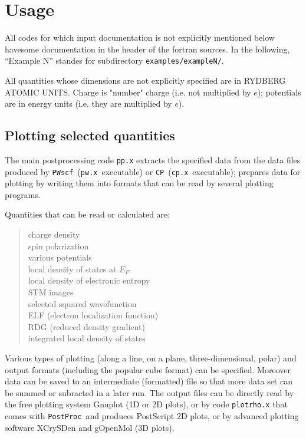 \documentclass[12pt,a4paper]{article}
\def\pwx{\texttt{pw.x}}
\def\cpx{\texttt{cp.x}}
\def\PWscf{\texttt{PWscf}}
\def\CP{\texttt{CP}}
\def\PostProc{\texttt{PostProc}}
\begin{document}
\section{Usage}

All codes for which input documentation is not explicitly mentioned below
havesome documentation in the header of the fortran sources.
In the following, ``Example N'' standes for subdirectory 
\texttt{examples/exampleN/}.

All quantities whose dimensions are not explicitly specified are in
RYDBERG ATOMIC UNITS. Charge is "number" charge (i.e. not multiplied 
by $e$); potentials are in energy units (i.e. they are multiplied by 
$e$).

\subsection{Plotting selected quantities}
  
The main postprocessing code \texttt{pp.x} extracts the specified data
from the data files produced by \PWscf\ (\pwx\ executable) or \CP\ 
(\cpx\ executable); prepares data for plotting by writing them into 
formats that can be read by several plotting programs.

Quantities that can be read or calculated are:
\begin{quote}
      charge density\\
      spin polarization\\
      various potentials\\
      local density of states at $E_F$\\
      local density of electronic entropy\\
      STM images\\
      selected squared wavefunction\\
      ELF (electron localization function)\\
      RDG (reduced density gradient)\\
      integrated local density of states
\end{quote}
Various types of plotting (along a line, on a plane, three-dimensional, polar)
and output formats (including the popular cube format) can be specified.
Moreover data can be saved to an intermediate (formatted) file so that
more data set can be summed or subracted in a later run.
The output files can be directly read by the free plotting system Gnuplot
(1D or 2D plots), or by code \texttt{plotrho.x} that comes with \PostProc\ 
and produces PostScript 2D plots,
or by advanced plotting software XCrySDen and gOpenMol (3D plots).
\end{document}
